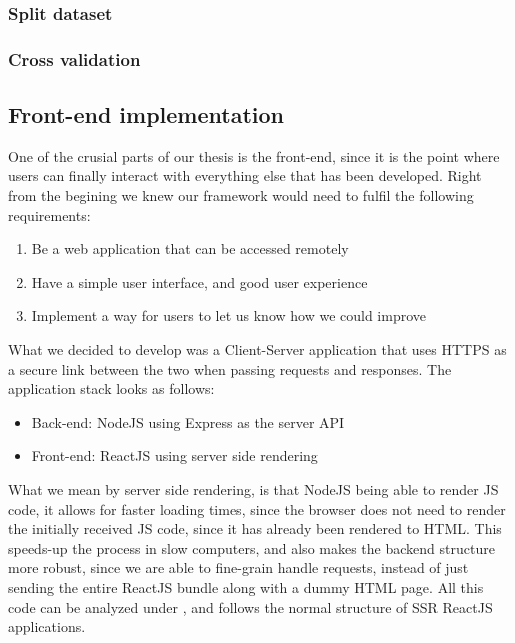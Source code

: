 \subsubsection{Split dataset}


\subsubsection{Cross validation}


\subsection{Front-end implementation}

One of the crusial parts of our thesis is the front-end, since it is the point where users can finally interact with everything else that has been developed. Right from the begining we knew our framework would need to fulfil the following requirements:

\begin{enumerate}
	\item Be a web application that can be accessed remotely
	\item Have a simple user interface, and good user experience
	\item Implement a way for users to let us know how we could improve
\end{enumerate}

What we decided to develop was a Client-Server application that uses HTTPS as a secure link between the two when passing requests and responses. The application stack looks as follows:

\begin{itemize}
	\item Back-end: NodeJS using Express as the server API 
	\item Front-end: ReactJS using server side rendering
\end{itemize}

What we mean by server side rendering, is that NodeJS being able to render JS code, it allows for faster loading times, since the browser does not need to render the initially received JS code, since it has already been rendered to HTML. This speeds-up the process in slow computers, and also makes the backend structure more robust, since we are able to fine-grain handle requests, instead of just sending the entire ReactJS bundle along with a dummy HTML page. All this code can be analyzed under \parencite{ricardo}, and follows the normal structure of SSR ReactJS applications.

